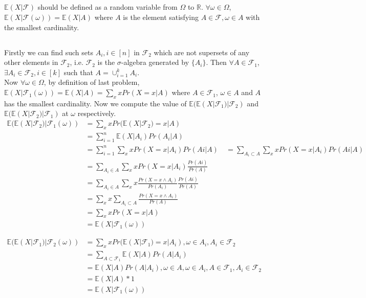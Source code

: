 \documentclass[12pt,letterpaper]{article}
\begin{document}
\subsection{}
$\mathbb{E}(X|\mathcal{F})$ should be defined as a random variable from $\Omega$ to $\mathbb{R}$. $\forall\omega\in\Omega$, $\mathbb{E}(X|\mathcal{F(\omega)})=\mathbb{E}(X|A)$ where $A$ is the element satisfying $A\in\mathcal{F},\omega\in A$ with the smallest cardinality.   
\subsection{}
Firstly we can find such sets $A_i, i\in [n]$ in $\mathcal{F}_2$ which are not supersets of any other elements in $\mathcal{F}_2$, i.e. $\mathcal{F}_2$ is the $\sigma$-algebra generated by $\{A_i\}$. Then $\forall A\in\mathcal{F}_1$, $\exists A_i\in\mathcal{F}_2,i\in [k]$ such that $A=\cup_{i=1}^{k}A_i$.\\
Now $\forall\omega\in\Omega$, by definition of last problem, $\mathbb{E}(X|\mathcal{F}_1(\omega))=\mathbb{E}(X|A)=\sum_{x}xPr(X=x|A)$ where $A\in\mathcal{F}_1$, $\omega\in A$ and $A$ has the smallest cardinality. Now we compute the value of $\mathbb{E}(\mathbb{E}(X|\mathcal{F}_1)|\mathcal{F}_2)$ and $\mathbb{E}(\mathbb{E}(X|\mathcal{F}_2)|\mathcal{F}_1)$ at $\omega$ respectively.\\
\begin{align}
\mathbb{E}(\mathbb{E}(X|\mathcal{F}_2)|\mathcal{F}_1(\omega))&=\sum_{x}xPr(\mathbb{E}(X|\mathcal{F}_2)=x|A)\\
&=\sum_{i=1}^{n}\mathbb{E}(X|A_i)Pr(A_i|A)\\
&=\sum_{i=1}^{n}\sum_{x}xPr(X=x|A_i)Pr(Ai|A)\
&=\sum_{A_i\subset A}\sum_{x}xPr(X=x|A_i)Pr(Ai|A)\\
&=\sum_{A_i\in A}\sum_{x}xPr(X=x|A_i)\frac{Pr(Ai)}{Pr(A)}\\
&=\sum_{A_i\in A}\sum_{x}x\frac{Pr(X=x\wedge A_i)}{Pr(A_i)}\frac{Pr(Ai)}{Pr(A)}\\
&=\sum_xx\sum_{A_i\subset A}\frac{Pr(X=x\wedge A_i)}{Pr(A)}\\
&=\sum_xxPr(X=x|A)\\
&=\mathbb{E}(X|\mathcal{F}_1(\omega))
\end{align}

\begin{align}
\mathbb{E}(\mathbb{E}(X|\mathcal{F}_1)|\mathcal{F}_2(\omega))&=\sum_{x}xPr(\mathbb{E}(X|\mathcal{F}_1)=x|A_i), \omega\in A_i, A_i\in\mathcal{F}_2\\
&=\sum_{A\subset\mathcal{F}_1}\mathbb{E}(X|A)Pr(A|A_i)\\
&=\mathbb{E}(X|A)Pr(A|A_i), \omega\in A, \omega\in A_i, A\in\mathcal{F}_1, A_i\in\mathcal{F}_2\\
&=\mathbb{E}(X|A)*1\\
&=\mathbb{E}(X|\mathcal{F}_1(\omega))
\end{align}
\end{document}
